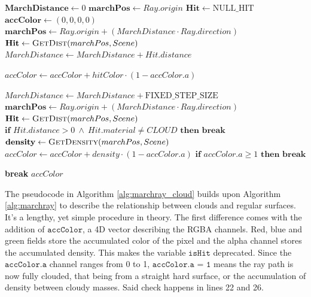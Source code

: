\begin{algorithm}[ht]
\caption{MarchRay}
\label{alg:marchray_cloud}
\begin{algorithmic}[1]
    \State $\mathbf{MarchDistance} \gets 0$
    \State $\mathbf{marchPos} \gets Ray.origin$
    \State $\mathbf{Hit} \gets \text{NULL\_HIT}$
    \State $\mathbf{accColor} \gets (0,0,0,0)$
        \State $\mathbf{marchPos} \gets Ray.origin + (MarchDistance \cdot Ray.direction)$
        \State $\mathbf{Hit} \gets \Call{GetDist}{marchPos, Scene}$
        \State $MarchDistance \gets MarchDistance + Hit.distance$
        
            \State $accColor \gets accColor + hitColor \cdot (1 - accColor.a)$
        \EndIf

                \State $MarchDistance \gets MarchDistance + \text{FIXED\_STEP\_SIZE}$
                \State $\mathbf{marchPos} \gets Ray.origin + (MarchDistance \cdot Ray.direction)$
                \State $\mathbf{Hit} \gets \Call{GetDist}{marchPos, Scene}$
                \State $\textbf{if } Hit.distance > 0 \ \land \ Hit.material \neq CLOUD \textbf{ then } \textbf{break}$
                \State $\mathbf{density} \gets \Call{GetDensity}{marchPos, Scene}$
                    \State $accColor \gets accColor + density \cdot (1 - accColor.a)$
                    \State $\textbf{if } accColor.a \geq 1 \textbf{ then } \textbf{break}$
                \EndIf
            \EndFor
        \EndIf

            \State \textbf{break}
        \EndIf
    \EndFor
    \State \Return $accColor$
\EndProcedure
\end{algorithmic}
\end{algorithm}

The pseudocode in Algorithm \ref{alg:marchray_cloud} builds upon Algorithm \ref{alg:marchray} to describe the relationship between clouds and regular surfaces. It's a lengthy, yet simple procedure in theory. The first difference comes with the addition of $\texttt{accColor}$, a 4D vector describing the RGBA channels. Red, blue and green fields store the accumulated color of the pixel and the alpha channel stores the accumulated density. This makes the variable $\texttt{isHit}$ deprecated. Since the $\texttt{accColor.a}$ channel ranges from 0 to 1, $\texttt{accColor.a = 1}$ means the ray path is now fully clouded, that being from a straight hard surface, or the accumulation of density between cloudy masses. Said check happens in lines 22 and 26.

